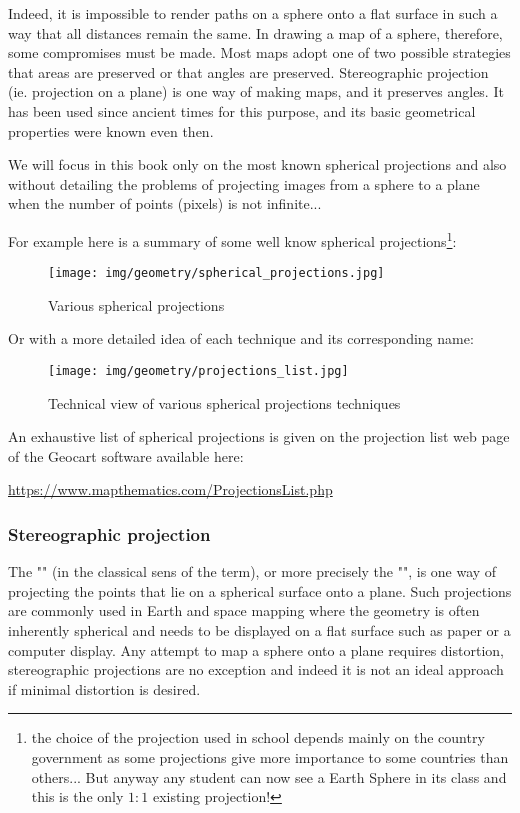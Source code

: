 	Indeed, it is impossible to render paths on a sphere onto a flat surface in such a way that all distances remain the same. In drawing a map of a sphere, therefore, some compromises must be made. Most maps adopt one of two possible strategies that areas are preserved or that angles are preserved. Stereographic projection (ie. projection on a plane) is one way of making maps, and it preserves angles. It has been used since ancient times for this purpose, and its basic geometrical properties were known even then.

	We will focus in this book only on the most known spherical projections and also without detailing the problems of projecting images from a sphere to a plane when the number of points (pixels) is not infinite...
	
	For example here is a summary of some well know spherical projections\footnote{the choice of the projection used in school depends mainly on the country government as some projections give more importance to some countries than others... But anyway any student can now see a Earth Sphere in its class and this is the only $1:1$ existing projection!}:
	\begin{figure}[H]
		\centering
		\texttt{[image: img/geometry/spherical\_projections.jpg]}
		\caption{Various spherical projections}
	\end{figure}
	Or with a more detailed idea of each technique and its corresponding name:
	\begin{figure}[H]
		\centering
		\texttt{[image: img/geometry/projections\_list.jpg]}
		\caption{Technical view of various spherical projections techniques}
	\end{figure}
	\begin{tcolorbox}[title=Remark,colframe=black,arc=10pt]
	An exhaustive list of spherical projections is given on the projection list web page of the Geocart software available here: 	
	\begin{center}
	\url{https://www.mapthematics.com/ProjectionsList.php}
	\end{center}
	\end{tcolorbox}
	
	\subsubsection{Stereographic projection}
	The "" (in the classical sens of the term), or more precisely the "", is one way of projecting the points that lie on a spherical surface onto a plane. Such projections are commonly used in Earth and space mapping where the geometry is often inherently spherical and needs to be displayed on a flat surface such as paper or a computer display. Any attempt to map a sphere onto a plane requires distortion, stereographic projections are no exception and indeed it is not an ideal approach if minimal distortion is desired. 

